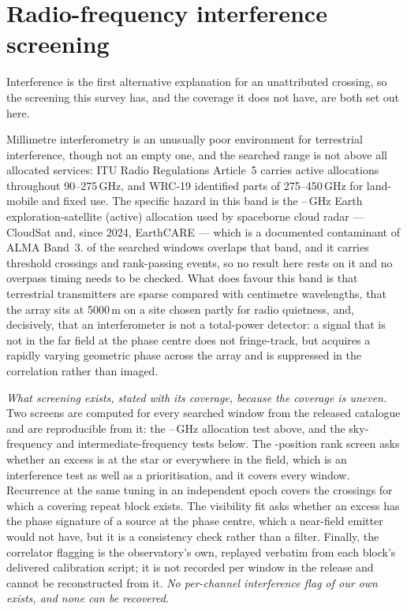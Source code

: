 \section{Radio-frequency interference screening}
\label{app:rfi}

Interference is the first alternative explanation for an unattributed
crossing, so the screening this survey has, and the coverage it does not
have, are both set out here.

Millimetre interferometry is an unusually poor environment for terrestrial
interference, though not an empty one, and the searched range is not above
all allocated services: ITU Radio Regulations Article~5 carries active
allocations throughout 90--275\,GHz, and WRC-19 identified parts of
275--450\,GHz for land-mobile and fixed use. The specific hazard in this band
is the \RadarLo--\RadarHi\,GHz Earth exploration-satellite (active)
allocation used by spaceborne cloud radar --- CloudSat and, since 2024,
EarthCARE --- which is a documented contaminant of ALMA Band~3. \RadarNWin{}
of the \RadarNTot{} searched windows overlaps that band, and it carries
\RadarNCross{} threshold crossings and \RadarNStage{} rank-passing events, so
no result here rests on it and no overpass timing needs to be checked. What
does favour this band is that terrestrial transmitters are sparse compared
with centimetre wavelengths, that the array sits at 5000\,m on a site chosen
partly for radio quietness, and, decisively, that an interferometer is not a
total-power detector: a signal that is not in the far field at the phase
centre does not fringe-track, but acquires a rapidly varying geometric phase
across the array and is suppressed in the correlation rather than imaged.

\emph{What screening exists, stated with its coverage, because the coverage
is uneven.} Two screens are computed for every searched window from the
released catalogue and are reproducible from it: the
\RadarLo--\RadarHi\,GHz allocation test above, and the sky-frequency and
intermediate-frequency tests below. The \NCtrl-position rank screen asks
whether an excess is at the star or everywhere in the field, which is an
interference test as well as a prioritisation, and it covers every window.
Recurrence at the same tuning in an independent epoch covers the crossings
for which a covering repeat block exists. The visibility fit asks whether an
excess has the phase signature of a source at the phase centre, which a
near-field emitter would not have, but it is a consistency check rather than
a filter. Finally, the correlator flagging is the observatory's own, replayed
verbatim from each block's delivered calibration script; it is not recorded
per window in the release and cannot be reconstructed from it. \emph{No
per-channel interference flag of our own exists, and none can be recovered.}

